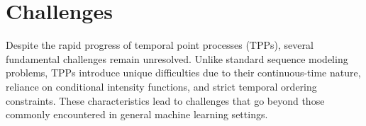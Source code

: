 \documentclass[10pt]{article} %
\begin{document}


\section{Challenges}

Despite the rapid progress of temporal point processes (TPPs), several fundamental challenges remain unresolved. Unlike standard sequence modeling problems, TPPs introduce unique difficulties due to their continuous-time nature, reliance on conditional intensity functions, and strict temporal ordering constraints. These characteristics lead to challenges that go beyond those commonly encountered in general machine learning settings.
\end{document}
